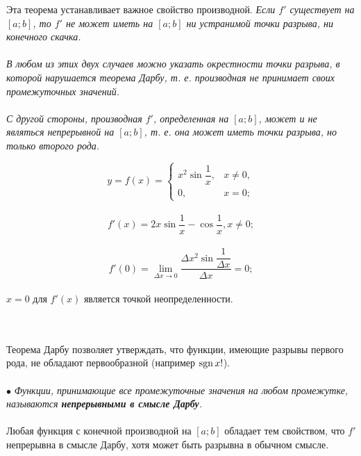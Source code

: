 Эта теорема устанавливает важное свойство производной.
\it {Если $f'$ существует на $[a;b]$, то $f'$ не может иметь на $[a;b]$ ни устранимой точки разрыва, ни конечного скачка.}\\\\
\rm В любом из этих двух случаев можно указать окрестности точки разрыва, в которой нарушается теорема Дарбу, т. е. производная не принимает своих промежуточных значений.\\\\
С другой стороны, производная $f'$, определенная на $[a;b]$, может и не являться непрерывной на $[a;b]$, т. е. она может иметь точки разрыва, но только второго рода.\\

\begin{example}
	$$y = f(x) = \begin{cases} x^2 \sin{\dfrac{1}{x}}, & x \neq 0, \\
		0, & x = 0; \end {cases}$$ \\
		$$f'(x) = 2x \sin{\dfrac{1}{x}} - \cos{\dfrac{1}{x}}, x \neq0; $$ \\
		$$f'(0) = \lim \limits_{\Delta x \rightarrow 0} \dfrac{\Delta x^2 \sin\dfrac{1}{\Delta x}}{\Delta x} = 0; $$ \\
		$x = 0$ для $f'(x)$ является точкой неопределенности.
	\end{example}\\\\
	Теорема Дарбу позволяет утверждать, что функции,
	имеющие разрывы первого рода, не обладают первообразной
	(например $\operatorname{sgn} x!$). \\\\
	$\bullet$ \textit{Функции, принимающие все промежуточные значения
		на любом промежутке, называются \textbf{непрерывными в смысле Дарбу}.}\\\\
	Любая функция с конечной производной на $[a;b]$ обладает
	тем свойством, что $f'$ непрерывна в смысле Дарбу,
	хотя может быть разрывна в обычном смысле.
